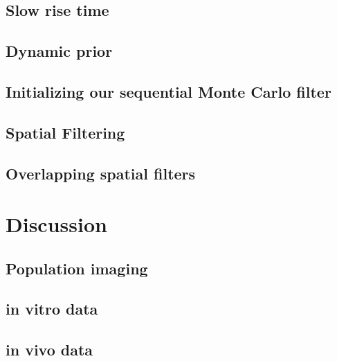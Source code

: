\clearpage\newpage
\subsection{Slow rise time} \label{sec:slow}


\clearpage\newpage
\subsection{Dynamic prior}


\clearpage\newpage
\subsection{Initializing our sequential Monte Carlo filter}


\clearpage\newpage
\subsection{Spatial Filtering} \label{sec:spatial}


\clearpage\newpage
\subsection{Overlapping spatial filters} \label{sec:overlap}


\newpage
\section{Discussion} \label{sec:dis}


\clearpage\newpage
\subsection{Population imaging} \label{sec:pop}


\clearpage\newpage
\subsection{in vitro data} \label{sec:vitro}


\clearpage\newpage
\subsection{in vivo data} \label{sec:vivo}




